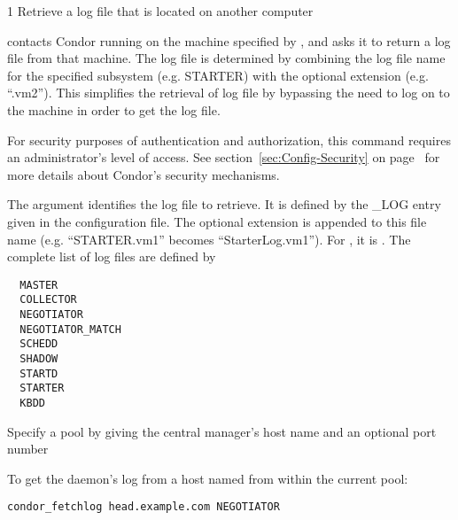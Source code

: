 \begin{ManPage}{\label{man-condor-fetchlog}}{1}
{Retrieve a log file that is located on another computer}

\Synopsis 
{}
\ToolArgsBase

\ToolArgsAffect
{}


\Description 

 contacts Condor running on the machine specified by
, and asks it to return a log file from that
machine.  The log file is determined by combining the log file name
for the specified subsystem (e.g. STARTER) with the optional extension
(e.g. ``.vm2'').  This simplifies the retrieval of log file by
bypassing the need to log on to the machine in order to get the log
file.

For security purposes of authentication and authorization, 
this command requires an administrator's level of access.
See section~\ref{sec:Config-Security} 
on page~\pageref{sec:Config-Security} for more details about Condor's
security mechanisms.

The  argument identifies the log file to retrieve.
It is defined by the \_LOG entry
given in the configuration file.  The optional extension is appended
to this file name (e.g. ``STARTER.vm1'' becomes ``StarterLog.vm1'').
For , it is .
The complete list of log files are defined by
\begin{verbatim}
  MASTER
  COLLECTOR
  NEGOTIATOR
  NEGOTIATOR_MATCH
  SCHEDD
  SHADOW
  STARTD
  STARTER
  KBDD
\end{verbatim}

\begin{Options}
    \ToolArgsBaseDesc
    {Specify a pool by giving the central manager's host name
    and an optional port number}
    \ToolArgsAffectDesc
\end{Options}

\Examples
To get the  daemon's log from a host named 
 from within the current pool:
\begin{verbatim}
condor_fetchlog head.example.com NEGOTIATOR
\end{verbatim}


\end{ManPage}

